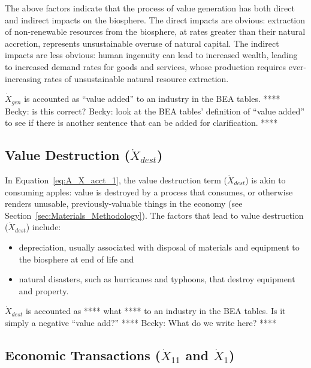 The above factors indicate that the process of value generation
has both direct and indirect impacts on the biosphere.
The direct impacts are obvious: 
extraction of non-renewable resources from the biosphere, 
at rates greater than their natural accretion,
represents unsustainable overuse of natural capital.
The indirect impacts are less obvious: 
human ingenuity can lead to increased wealth,
leading to increased demand rates for goods and services, 
whose production requires ever-increasing rates 
of unsustainable natural resource extraction.

$\dot{X}_{gen}$ is accounted as ``value added'' to an industry in the BEA tables.
**** Becky: is this correct? 
Becky: look at the BEA tables' definition of ``value added'' to 
see if there is another sentence that can be added for clarification. ****


\subsection{Value Destruction ($\dot{X}_{dest}$)}

\noindent In Equation~\ref{eq:A_X_acct_1}, 
the value destruction term ($\dot{X}_{dest}$) 
is akin to consuming apples: 
value is destroyed by a process that consumes, 
or otherwise renders unusable, 
previously-valuable things in the economy
(see Section~\ref{sec:Materials_Methodology}).
The factors that lead to value destruction
($\dot{X}_{dest}$) include:

\begin{itemize}
	\item{depreciation, usually associated with disposal of 
	materials and equipment to the biosphere at end of life and}
	\item{natural disasters, such as hurricanes and typhoons,
	that destroy equipment and property.}
\end{itemize}

$\dot{X}_{dest}$ is accounted as **** what **** to an industry in the BEA tables.
Is it simply a negative ``value add?''
**** Becky: What do we write here? ****


\subsection{Economic Transactions ($\dot{X}_{11}$ and $\dot{X}_{1}$)}

